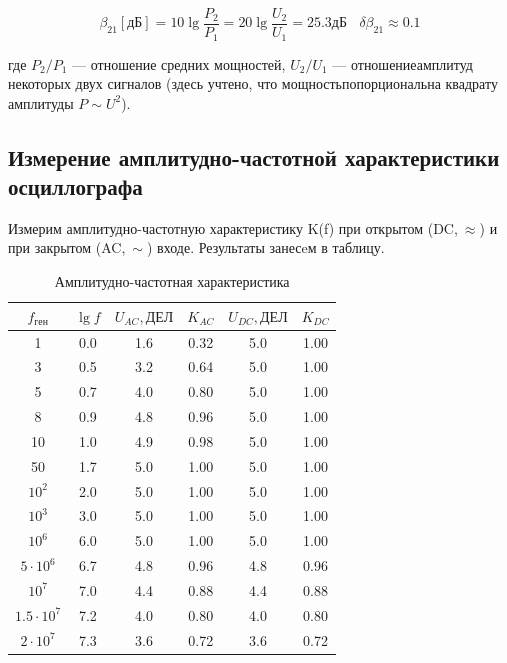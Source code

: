 \documentclass[a4paper,12pt]{article}
\begin{document}
	
	
	\begin{equation*}
	\beta_{21}[дБ]=10\lg\frac{P_2}{P_1}=20\lg\frac{U_2}{U_1}=25.3дБ \: \: \: \: \delta \beta_{21} \approx 0.1
	\end{equation*}
	
	где $P_2/P_1$ — отношение средних мощностей, $U_2/U_1$ — отношениеамплитуд некоторых двух сигналов (здесь учтено, что мощностьпопорциональна квадрату амплитуды $P \sim U^2$).
	
	
	\subsection*{Измерение амплитудно-частотной характеристики осциллографа}
	
	Измерим амплитудно-частотную характеристику K(f) при открытом (DC,$\:\approx$) и при закрытом (AC,$\:\sim$) входе. Результаты занесeм в таблицу.
	
	\begin{table}[h!]
		\centering
		\begin{tabular}{|c |c|c |c|c|c|}
			\hline
			$f_{ген}$ & $\lg f$ & $U_{AC}, ДЕЛ$& $K_{AC}$&$U_{DC}, ДЕЛ$& $K_{DC}$ \\
			\hline
			1 & 0.0 & 1.6 & 0.32 & 5.0 & 1.00 \\
			3 & 0.5 & 3.2 & 0.64 & 5.0 & 1.00 \\
			5 & 0.7 & 4.0 & 0.80 & 5.0 & 1.00 \\
			8 & 0.9 & 4.8 & 0.96 & 5.0 & 1.00 \\
			10 & 1.0 & 4.9 & 0.98 & 5.0 & 1.00 \\
			50 & 1.7 & 5.0 & 1.00 & 5.0 & 1.00 \\
			$10^2$ & 2.0 & 5.0 & 1.00 & 5.0 & 1.00 \\
		$10^3$  & 3.0 & 5.0 & 1.00 & 5.0 & 1.00 \\
			$10^6$  & 6.0 & 5.0 & 1.00 & 5.0 & 1.00 \\
			$5 \cdot 10^6$  & 6.7 & 4.8 & 0.96 & 4.8 & 0.96 \\
		$10^7$ & 7.0 & 4.4 & 0.88 & 4.4 & 0.88 \\
			$1.5 \cdot 10^7$  & 7.2 & 4.0 & 0.80 & 4.0 & 0.80 \\
		$2 \cdot 10^7$  & 7.3 & 3.6 & 0.72 & 3.6 & 0.72 \\
			\hline
		\end{tabular}
	\caption{Амплитудно-частотная характеристика}
	\end{table}
	
\end{document}
